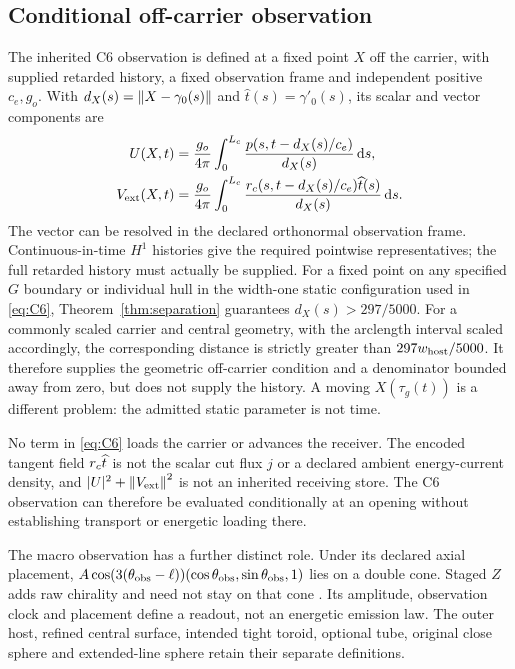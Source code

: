 \subsection{Conditional off-carrier observation}\label{sec:C6}
The inherited C6 observation \cite{CC} is defined at a fixed point $X$ off the carrier, with supplied retarded history, a fixed observation frame and independent positive $c_e,g_o$. With $d_X(s)=\left\lVert X-\gamma_0(s)\right\rVert$ and $\widehat t(s)=\gamma'_0(s)$, its scalar and vector components are
\begin{equation}\label{eq:C6}
 \begin{aligned}
 U(X,t)&=\frac{g_o}{4\pi}\int_0^{L_c}
 \frac{p(s,t-d_X(s)/c_e)}{d_X(s)}\,\mathrm d s,\\
 V_{\rm ext}(X,t)&=\frac{g_o}{4\pi}\int_0^{L_c}
 \frac{r_c(s,t-d_X(s)/c_e)\widehat t(s)}{d_X(s)}\,\mathrm d s.
 \end{aligned}
\end{equation}
The vector can be resolved in the declared orthonormal observation frame. Continuous-in-time $H^1$ histories give the required pointwise representatives; the full retarded history must actually be supplied. For a fixed point on any specified $G$ boundary or individual hull in the width-one static configuration used in \eqref{eq:C6}, Theorem~\ref{thm:separation} guarantees $d_X(s)>297/5000$. For a commonly scaled carrier and central geometry, with the arclength interval scaled accordingly, the corresponding distance is strictly greater than $297w_{\rm host}/5000$. It therefore supplies the geometric off-carrier condition and a denominator bounded away from zero, but does not supply the history. A moving $X(\tau_g(t))$ is a different problem: the admitted static parameter is not time.

No term in \eqref{eq:C6} loads the carrier or advances the receiver. The encoded tangent field $r_c\widehat t$ is not the scalar cut flux $j$ or a declared ambient energy-current density, and $|U|^2+\left\lVert V_{\rm ext}\right\rVert^2$ is not an inherited receiving store. The C6 observation can therefore be evaluated conditionally at an opening without establishing transport or energetic loading there.

The macro observation has a further distinct role. Under its declared axial placement, $A\cos(3(\theta_{\rm obs}-\ell))(\cos\theta_{\rm obs},\sin\theta_{\rm obs},1)$ lies on a double cone. Staged $Z$ adds raw chirality and need not stay on that cone \cite{CG,AX}. Its amplitude, observation clock and placement define a readout, not an energetic emission law. The outer host, refined central surface, intended tight toroid, optional tube, original close sphere and extended-line sphere retain their separate definitions.
